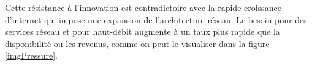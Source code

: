 






Cette résistance à l'innovation est contradictoire avec la rapide croissance d'internet qui impose une expansion de l'architecture réseau. 
Le besoin pour des services réseau et pour haut-débit augmente à un taux plus rapide que la disponibilité ou les revenus, comme on peut le visualiser dans la figure \ref{imgPressure}.


